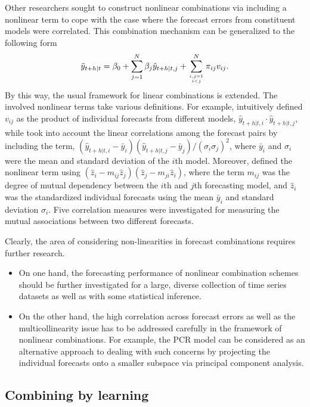 \documentclass[11pt]{article}
\begin{document}
Other researchers sought to construct nonlinear combinations via including a nonlinear term to cope with the case where the forecast errors from constituent models were correlated. This combination mechanism can be generalized to the following form
\begin{align*}
\tilde{y}_{t+h|t} =\beta_{0}+\sum_{j=1}^{N} \beta_{j} \hat{y}_{t+h|t, j}+\sum_{i,j=1 \atop i<j}^{N}\pi_{ij}v_{i j}.
\end{align*}
By this way, the usual framework for linear combinations is extended. The involved nonlinear terms take various definitions. For example, \cite{Freitas2006-fn} intuitively defined $v_{i j}$ as the product of individual forecasts from different models, $\hat{y}_{t+h|t, i} \cdot \hat{y}_{t+h|t, j}$, while \cite{Adhikari2012-ur} took into account the linear correlations among the forecast pairs by including the term, $(\hat{y}_{t+h|t, i}-\bar{y}_{i})(\hat{y}_{t+h|t, j}-\bar{y}_{j})/(\sigma_{i}\sigma_{j})^2$, where $\bar{y}_{i}$ and $\sigma_{i}$ were the mean and standard deviation of the $i$th model. Moreover, \cite{Adhikari2015-bb} defined the nonlinear term using $\left(\hat{z}_{i}-m_{i j} \hat{z}_{j}\right)\left(\hat{z}_{j}-m_{j i} \hat{z}_{i}\right)$, where the term $m_{i j}$ was the degree of mutual dependency between the $i$th and $j$th forecasting model, and $\hat{z}_{i}$ was the standardized individual forecasts using the mean $\bar{y}_{i}$ and standard deviation $\sigma_{i}$. Five correlation measures were investigated for measuring the mutual associations between two different forecasts.

Clearly, the area of considering non-linearities in forecast combinations requires further research.
\begin{itemize}
  \item On one hand, the forecasting performance of nonlinear combination schemes should be further investigated for a large, diverse collection of time series datasets as well as with some statistical inference.
  \item On the other hand, the high correlation across forecast errors as well as the multicollinearity issue has to be addressed carefully in the framework of nonlinear combinations. For example, the PCR model can be considered as an alternative approach to dealing with such concerns by projecting the individual forecasts onto a smaller subspace via principal component analysis.
\end{itemize}

\subsection{Combining by learning}
\label{sec:combining_by_learning}
\end{document}
